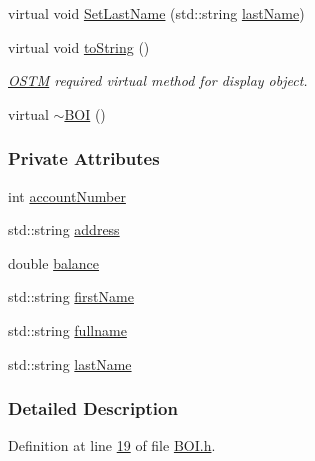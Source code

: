 \begin{DoxyCompactItemize}
\item 
virtual void \hyperlink{class_b_o_i_a663906e9a59ffa970fb928746c01e8af_a663906e9a59ffa970fb928746c01e8af}{Set\+Last\+Name} (std\+::string \hyperlink{class_b_o_i_ad51bfa6f28816c7f5036447ff809cecf_ad51bfa6f28816c7f5036447ff809cecf}{last\+Name})
\item 
virtual void \hyperlink{class_b_o_i_ab02a4dd4ebcc5b2abfaca19f2dff2006_ab02a4dd4ebcc5b2abfaca19f2dff2006}{to\+String} ()
\begin{DoxyCompactList}\small\item\em \hyperlink{class_o_s_t_m}{O\+S\+TM} required virtual method for display object. \end{DoxyCompactList}\item 
virtual \hyperlink{class_b_o_i_a617f46a599129178c6b11b4846759a6c_a617f46a599129178c6b11b4846759a6c}{$\sim$\+B\+OI} ()
\end{DoxyCompactItemize}
\subsubsection*{Private Attributes}
\begin{DoxyCompactItemize}
\item 
int \hyperlink{class_b_o_i_a35c9fd6e938eb44ad4e076bc6a736851_a35c9fd6e938eb44ad4e076bc6a736851}{account\+Number}
\item 
std\+::string \hyperlink{class_b_o_i_ab9315fe76fd9f07551f5ae7899d33516_ab9315fe76fd9f07551f5ae7899d33516}{address}
\item 
double \hyperlink{class_b_o_i_aa00a3d8baf3420647c40119b7fa4ed6f_aa00a3d8baf3420647c40119b7fa4ed6f}{balance}
\item 
std\+::string \hyperlink{class_b_o_i_a12872fd8c15dbf833f78862b00579ed1_a12872fd8c15dbf833f78862b00579ed1}{first\+Name}
\item 
std\+::string \hyperlink{class_b_o_i_a6d7c892a54bb6f7327cdc777081ab5f4_a6d7c892a54bb6f7327cdc777081ab5f4}{fullname}
\item 
std\+::string \hyperlink{class_b_o_i_ad51bfa6f28816c7f5036447ff809cecf_ad51bfa6f28816c7f5036447ff809cecf}{last\+Name}
\end{DoxyCompactItemize}


\subsubsection{Detailed Description}


Definition at line \hyperlink{_b_o_i_8h_source_l00019}{19} of file \hyperlink{_b_o_i_8h_source}{B\+O\+I.\+h}.



